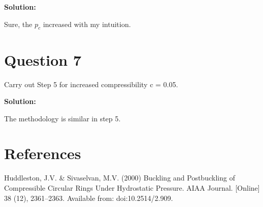 \documentclass{article}
\begin{document}
\textbf{Solution:} 



Sure, the $p_c$ increased with my intuition.






\section*{Question 7} 

Carry out Step 5 for increased compressibility c = 0.05.


\textbf{Solution:} 


The methodology is similar in step 5.









\section*{References} 

Huddleston, J.V. \& Sivaselvan, M.V. (2000) Buckling and Postbuckling of Compressible Circular Rings Under Hydrostatic Pressure. AIAA Journal. [Online] 38 (12), 2361–2363. Available from: doi:10.2514/2.909.
\end{document}
